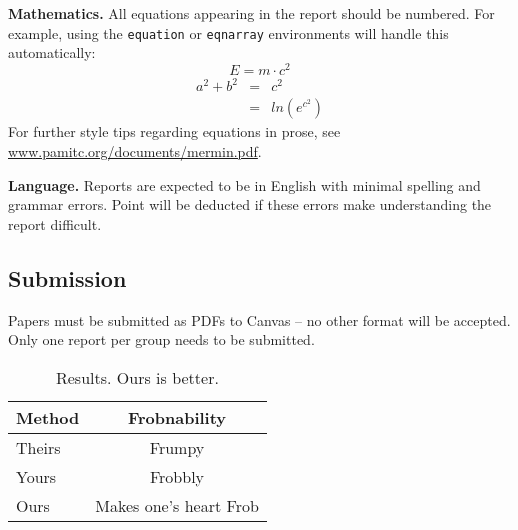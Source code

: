 \documentclass[10pt,twocolumn,letterpaper]{article}
\newcommand{\xhdr}[1]{\vspace{3pt}\noindent\textbf{#1}}
\begin{document}
\xhdr{Mathematics.} All equations appearing in the report should be numbered. For example, using the \texttt{equation} or \texttt{eqnarray} environments will handle this automatically:
%
\begin{equation}
  E = m\cdot c^2
  \label{eq:important}
\end{equation}
%
\begin{eqnarray}
a^2 + b^2 &=& c^2\\
         &=& ln(e^{c^2})
\end{eqnarray}
%
For further style tips regarding equations in prose, see \url{www.pamitc.org/documents/mermin.pdf}.

\xhdr{Language.} Reports are expected to be in English with minimal spelling and grammar errors. Point will be deducted if these errors make understanding the report difficult.

\subsection{Submission}
Papers must be submitted as PDFs to Canvas -- no other format will be accepted. Only one report per group needs to be submitted.





\begin{table}[t]
  \centering
  \begin{tabular}{@{}lc@{}}
    \toprule
    Method & Frobnability \\
    \midrule
    Theirs & Frumpy \\
    Yours & Frobbly \\
    Ours & Makes one's heart Frob\\
    \bottomrule
  \end{tabular}
  \caption{Results.   Ours is better.}
  \label{tab:example}
\end{table}






{\small


}
\end{document}
